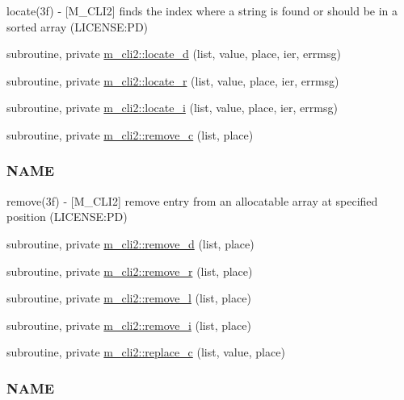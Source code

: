 \begin{DoxyCompactItemize}
\begin{DoxyCompactList}
locate(3f) -\/ \mbox{[}M\+\_\+\+C\+L\+I2\mbox{]} finds the index where a string is found or should be in a sorted array (L\+I\+C\+E\+N\+SE\+:PD) \end{DoxyCompactList}\item 
subroutine, private \mbox{\hyperlink{namespacem__cli2_a0e859cd8635ab617ea9a4e9b4ffca852}{m\+\_\+cli2\+::locate\+\_\+d}} (list, value, place, ier, errmsg)
\item 
subroutine, private \mbox{\hyperlink{namespacem__cli2_a2e12eb8c0ae6ce90b821141699e627df}{m\+\_\+cli2\+::locate\+\_\+r}} (list, value, place, ier, errmsg)
\item 
subroutine, private \mbox{\hyperlink{namespacem__cli2_a3cc41a1a629f9ab278376a71b243673d}{m\+\_\+cli2\+::locate\+\_\+i}} (list, value, place, ier, errmsg)
\item 
subroutine, private \mbox{\hyperlink{namespacem__cli2_a155af513c048d68552ec2e8fb54e1294}{m\+\_\+cli2\+::remove\+\_\+c}} (list, place)
\begin{DoxyCompactList}\small\item\em \subsubsection*{N\+A\+ME}

remove(3f) -\/ \mbox{[}M\+\_\+\+C\+L\+I2\mbox{]} remove entry from an allocatable array at specified position (L\+I\+C\+E\+N\+SE\+:PD) \end{DoxyCompactList}\item 
subroutine, private \mbox{\hyperlink{namespacem__cli2_a5deb6a427a39e04c5a18a82497d5cf84}{m\+\_\+cli2\+::remove\+\_\+d}} (list, place)
\item 
subroutine, private \mbox{\hyperlink{namespacem__cli2_a281edafaa6f74c30bd8de6d0c1d05be6}{m\+\_\+cli2\+::remove\+\_\+r}} (list, place)
\item 
subroutine, private \mbox{\hyperlink{namespacem__cli2_ae3fc38d25a8a4892bde95a7198c2495a}{m\+\_\+cli2\+::remove\+\_\+l}} (list, place)
\item 
subroutine, private \mbox{\hyperlink{namespacem__cli2_a1c2bd26b3c04a499cc65b00133dfe6b9}{m\+\_\+cli2\+::remove\+\_\+i}} (list, place)
\item 
subroutine, private \mbox{\hyperlink{namespacem__cli2_affd644ac84d1010b40748f80d142d6b3}{m\+\_\+cli2\+::replace\+\_\+c}} (list, value, place)
\begin{DoxyCompactList}\small\item\em \subsubsection*{N\+A\+ME}


\end{DoxyCompactList}
\end{DoxyCompactItemize}
